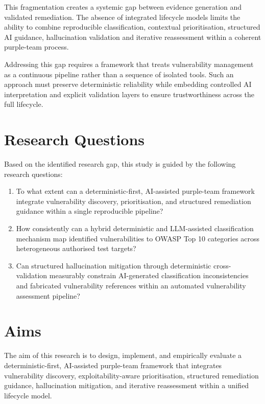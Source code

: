 \documentclass[12pt, a4paper, oneside]{report}
\begin{document}
This fragmentation creates a systemic gap between evidence generation
and validated remediation. The absence of integrated lifecycle models
limits the ability to combine reproducible classification, contextual
prioritisation, structured AI guidance, hallucination validation and
iterative reassessment within a coherent purple-team process.

Addressing this gap requires a framework that treats vulnerability
management as a continuous pipeline rather than a sequence of isolated
tools. Such an approach must preserve deterministic reliability while
embedding controlled AI interpretation and explicit validation layers to
ensure trustworthiness across the full lifecycle.

\section{Research Questions}
\label{sec:rqs}

Based on the identified research gap, this study is guided by the
following research questions:

\begin{enumerate}[label=\Roman*.]
  \item To what extent can a deterministic-first, AI-assisted purple-team
    framework integrate vulnerability discovery, prioritisation, and structured
    remediation guidance within a single reproducible pipeline?

  \item How consistently can a hybrid deterministic and LLM-assisted
    classification mechanism map identified vulnerabilities to OWASP Top 10
    categories across heterogeneous authorised test targets?

  \item Can structured hallucination mitigation through deterministic
    cross-validation measurably constrain AI-generated classification
    inconsistencies and fabricated vulnerability references within an
    automated vulnerability assessment pipeline?
\end{enumerate}

\section{Aims}

The aim of this research is to design, implement, and empirically
evaluate a deterministic-first, AI-assisted purple-team framework that
integrates vulnerability discovery, exploitability-aware prioritisation,
structured remediation guidance, hallucination mitigation, and iterative
reassessment within a unified lifecycle model.
\end{document}
